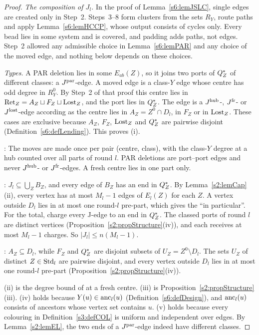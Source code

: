 \begin{proof}
\emph{The composition of $J_l$.} In the proof of Lemma~\ref{s6:lemJSLC}, single edges are created only in Step~2. Steps~3--8 form clusters from the sets $R_Y$, route paths and apply Lemma~\ref{s6:lemHCCP}, whose output consists of cycles only. Every bead lies in some system and is covered, and padding adds paths, not edges. Step~2 allowed any admissible choice in Lemma~\ref{s6:lemPAR} and any choice of the moved edge, and nothing below depends on these choices.

\emph{Types.} A PAR deletion lies in some $E_{ab}(Z)$, so it joins two ports of $Q^{*}_Z$ of different classes: a $J^{\mathrm{par}}$-edge. A moved edge is a class-$Y$ edge whose centre has odd degree in $R^0_Y$. By Step~2 of that proof this centre lies in $\mathrm{Ret}_Z=A_Z\sqcup F_Z\sqcup\mathrm{Lost}_Z$, and the port lies in $Q^{*}_Z$. The edge is a $J^{\mathrm{hub}}$-, $J^{\mathrm{fr}}$- or $J^{\mathrm{lost}}$-edge according as the centre lies in $A_Z=Z^0\cap D_l$, in $F_Z$ or in $\mathrm{Lost}_Z$. These cases are exclusive because $A_Z$, $F_Z$, $\mathrm{Lost}_Z$ and $Q^{*}_Z$ are pairwise disjoint (Definition~\ref{s6:defLending}). This proves (i).

: The moves are made once per pair (centre, class), with the class-$Y$ degree at a hub counted over all parts of round $l$. PAR deletions are port--port edges and never $J^{\mathrm{hub}}$- or $J^{\mathrm{fr}}$-edges. A fresh centre lies in one part only.

: $J_l\subseteq\bigcup_ZB_Z$, and every edge of $B_Z$ has an end in $Q^{*}_Z$. By Lemma~\ref{s2:lemCap}(ii), every vertex has at most $M_l-1$ edges of $E_l(Z)$ for each $Z$. A vertex outside $D_l$ lies in at most one round-$l$ pre-part, which gives the ``in particular''. For the total, charge every J-edge to an end in $Q^{*}_Z$. The classed ports of round $l$ are distinct vertices (Proposition~\ref{s2:propStructure}(iv)), and each receives at most $M_l-1$ charges. So $|J_l|\le n(M_l-1)$.

: $A_Z\subseteq D_l$, while $F_Z$ and $Q^{*}_Z$ are disjoint subsets of $U_Z=Z^0\setminus D_l$. The sets $U_Z$ of distinct $Z\in\mathrm{Std}_l$ are pairwise disjoint, and every vertex outside $D_l$ lies in at most one round-$l$ pre-part (Proposition~\ref{s2:propStructure}(iv)).

(ii) is the degree bound of  at a fresh centre. (iii) is Proposition~\ref{s2:propStructure}(iii). (iv) holds because $Y(u)\in\mathrm{anc}_l(u)$ (Definition~\ref{s6:defDesign}), and $\mathrm{anc}_l(u)$ consists of ancestors whose vertex set contains $u$. (v) holds because every colouring in Definition~\ref{s3:defCOL} is uniform and independent over edges. By Lemma~\ref{s2:lemEL}, the two ends of a $J^{\mathrm{par}}$-edge indeed have different classes.
\end{proof}

